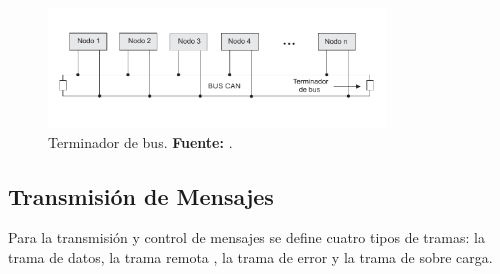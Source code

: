 \begin{figure}[H]
	\centering
		\includegraphics[width=0.8\textwidth]{./Cap2imagen/terminador.pdf}
	\caption[Terminador de bus.]{Terminador de bus.\textbf{ Fuente:} \cite{PSMR}.}
	\label{T_B} %
\end{figure}




\subsection {Transmisión de Mensajes}
Para la transmisión y control de mensajes se define cuatro tipos de tramas: la trama de datos, la trama remota , la trama de error y la trama de sobre carga.

